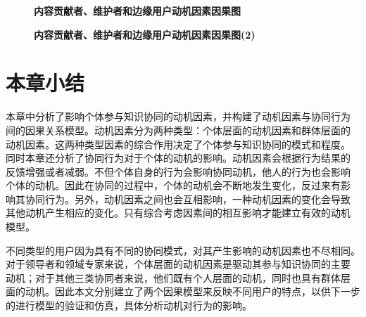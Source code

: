 \begin{figure}[!htb]
  \centering
  \caption{\small{\textbf{内容贡献者、维护者和边缘用户动机因素因果图}}}
  \label{fig:motive2}
\end{figure}

\begin{figure}[!htb]
  \centering
  \caption{\small{\textbf{内容贡献者、维护者和边缘用户动机因素因果图(2)}}}
  \label{fig:motive3}
\end{figure}

\section{本章小结}

本章中分析了影响个体参与知识协同的动机因素，并构建了动机因素与协同行为
间的因果关系模型。动机因素分为两种类型：个体层面的动机因素和群体层面的
动机因素。这两种类型因素的综合作用决定了个体参与知识协同的模式和程度。
同时本章还分析了协同行为对于个体的动机的影响。动机因素会根据行为结果的
反馈增强或者减弱。不但个体自身的行为会影响协同动机，他人的行为也会影响
个体的动机。因此在协同的过程中，个体的动机会不断地发生变化，反过来有影
响其协同行为。另外，动机因素之间也会互相影响，一种动机因素的变化会导致
其他动机产生相应的变化。只有综合考虑因素间的相互影响才能建立有效的动机
模型。

不同类型的用户因为具有不同的协同模式，对其产生影响的动机因素也不尽相同。
对于领导者和领域专家来说，个体层面的动机因素是驱动其参与知识协同的主要
动机；对于其他三类协同者来说，他们既有个人层面的动机，同时也具有群体层
面的动机。因此本文分别建立了两个因果模型来反映不同用户的特点，以供下一步
的进行模型的验证和仿真，具体分析动机对行为的影响。

